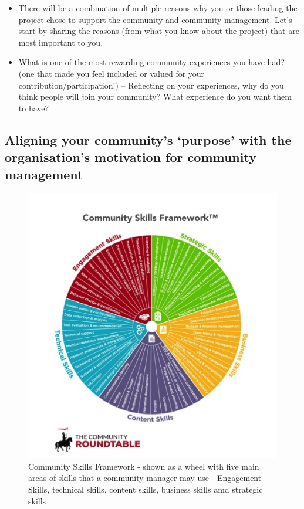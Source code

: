 \documentclass[
  letterpaper,
  DIV=11,
  numbers=noendperiod]{scrreport}
\providecommand{\tightlist}{%
  \setlength{\itemsep}{0pt}\setlength{\parskip}{0pt}}\usepackage{longtable,booktabs,array}
\begin{document}
\begin{itemize}
\tightlist
\item
  There will be a combination of multiple reasons why you or those
  leading the project chose to support the community and community
  management. Let's start by sharing the reasons (from what you know
  about the project) that are most important to you.
\item
  What is one of the most rewarding community experiences you have had?
  (one that made you feel included or valued for your
  contribution/participation!) -- Reflecting on your experiences, why do
  you think people will join your community? What experience do you want
  them to have?
\end{itemize}

\hypertarget{aligning-your-communitys-purpose-with-the-organisations-motivation-for-community-management}{%
\subsection{Aligning your community's `purpose' with the organisation's
motivation for community
management}\label{aligning-your-communitys-purpose-with-the-organisations-motivation-for-community-management}}

\begin{figure}

{\centering \includegraphics{quarto_files/images/CommunitySkillsFramework-TheCR.jpg}

}

\caption{Community Skills Framework - shown as a wheel with five main
areas of skills that a community manager may use - Engagement Skills,
technical skills, content skills, business skills amd strategic skills}

\end{figure}
\end{document}
